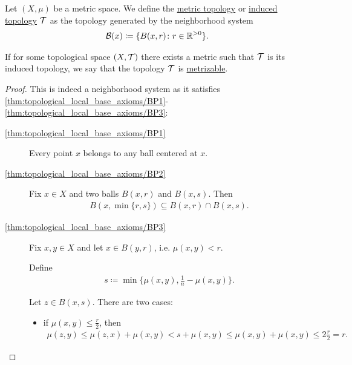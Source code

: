 \begin{definition}\label{def:metric_topology}\cite[249]{Engelking1989}
  Let $(X, \mu)$ be a metric space. We define the \ul{metric topology} or \ul{induced topology} $\mathcal T$ as the topology generated by the neighborhood system
  \begin{align*}
    \mathcal B(x) \coloneqq \{ B (x, r) \colon r \in \mathbb R^{>0} \}.
  \end{align*}

  If for some topological space $(X, \mathcal T)$ there exists a metric such that $\mathcal T$ is its induced topology, we say that the topology $\mathcal T$ is \ul{metrizable}.
\end{definition}
\begin{proof}
  This is indeed a neighborhood system as it satisfies \ref{thm:topological_local_base_axioms/BP1}-\ref{thm:topological_local_base_axioms/BP3}:

  \begin{description}
    \item[\ref{thm:topological_local_base_axioms/BP1}] Every point $x$ belongs to any ball centered at $x$.

    \item[\ref{thm:topological_local_base_axioms/BP2}] Fix $x \in X$ and two balls $B(x, r)$ and $B(x, s)$. Then
    \begin{align*}
      B(x, \min\{ r, s \}) \subseteq B(x, r) \cap B(x, s).
    \end{align*}

    \item[\ref{thm:topological_local_base_axioms/BP3}] Fix $x, y \in X$ and let $x \in B(y, r)$, i.e. $\mu(x, y) < r$.

    Define
    \begin{align*}
      s \coloneqq \min\{ \mu(x, y), \frac 1 n - \mu(x, y) \}.
    \end{align*}

    Let $z \in B(x, s)$. There are two cases:
    \begin{itemize}
      \item if $\mu(x, y) \leq \tfrac r 2$, then
      \begin{align*}
        \mu(z, y)
        \leq
        \mu(z, x) + \mu(x, y)
        <
        s + \mu(x, y)
        \leq
        \mu(x, y) + \mu(x, y)
        \leq
        2 \tfrac r 2
        =
        r.
      \end{align*}


\end{itemize}
\end{description}
\end{proof}
